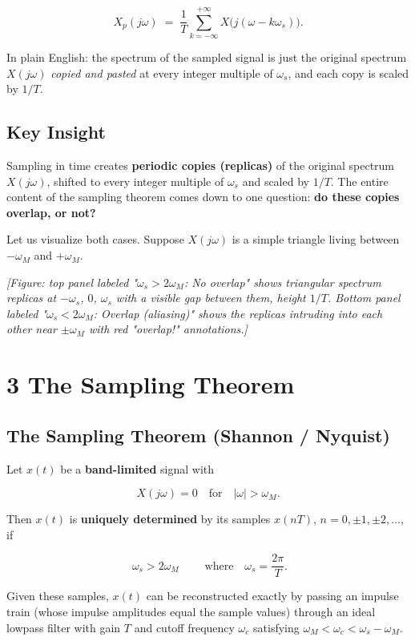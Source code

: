 \documentclass[11pt]{article}
\begin{document}
\[\boxed{\,X_p(j\omega) \;=\; \frac{1}{T}\sum_{k=-\infty}^{+\infty} X\!\big(j(\omega-k\omega_s)\big).\,} \tag{4}\]

In plain English: the spectrum of the sampled signal is just the original spectrum $X(j\omega)$ \textit{copied and pasted} at every integer multiple of $\omega_s$, and each copy is scaled by $1/T$.

\subsection*{Key Insight}

Sampling in time creates \textbf{periodic copies (replicas)} of the original spectrum $X(j\omega)$, shifted to every integer multiple of $\omega_s$ and scaled by $1/T$. The entire content of the sampling theorem comes down to one question: \textbf{do these copies overlap, or not?}

Let us visualize both cases. Suppose $X(j\omega)$ is a simple triangle living between $-\omega_M$ and $+\omega_M$.

\textit{[Figure: top panel labeled "$\omega_s > 2\omega_M$: No overlap" shows triangular spectrum replicas at $-\omega_s$, $0$, $\omega_s$ with a visible gap between them, height $1/T$. Bottom panel labeled "$\omega_s < 2\omega_M$: Overlap (aliasing)" shows the replicas intruding into each other near $\pm\omega_M$ with red "overlap!" annotations.]}

\section*{3 The Sampling Theorem}

\subsection*{The Sampling Theorem (Shannon / Nyquist)}

Let $x(t)$ be a \textbf{band-limited} signal with

\[X(j\omega) = 0 \quad \text{for}\quad |\omega| > \omega_M.\]

Then $x(t)$ is \textbf{uniquely determined} by its samples $x(nT)$, $n = 0, \pm 1, \pm 2, \ldots$, if

\[\boxed{\;\omega_s > 2\omega_M\;} \qquad \text{where}\quad \omega_s = \frac{2\pi}{T}.\]

Given these samples, $x(t)$ can be reconstructed exactly by passing an impulse train (whose impulse amplitudes equal the sample values) through an ideal lowpass filter with gain $T$ and cutoff frequency $\omega_c$ satisfying $\omega_M < \omega_c < \omega_s - \omega_M$.
\end{document}

